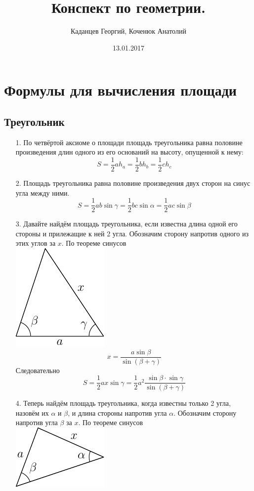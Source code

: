 \documentclass[titlepage]{article}
\title{Конспект по геометрии.}
\author{Каданцев Георгий, Коченюк Анатолий }
\date{13.01.2017}
\begin{document}
\maketitle
\setlength{\unitlength}{1cm}
\section{Формулы для вычисления площади}
    \subsection{Треугольник}
        \begin{itemize}
            \item[1.] По четвёртой аксиоме о площади площадь треугольника равна половине произведения длин одного из его оснований  на высоту, опущенной к нему:  
            $$\boxed{ S= \frac{1}{2}ah_a =\frac{1}{2}bh_b=\frac{1}{2}ch_c} $$
            \item[2.] Площадь треугольника равна половине произведения двух сторон на синус угла между ними.
            $$ \boxed{S=\frac{1}{2}ab\sin \gamma = \frac{1}{2}bc\sin \alpha = \frac{1}{2}ac \sin \beta} $$
            \item[3.] 
             Давайте найдём площадь треугольника, если известна длина одной его стороны и прилежащие к ней 2 угла. Обозначим сторону напротив одного из этих углов за $x$. По теореме синусов\\
             \includegraphics{pic_1o1.pdf}
            $$ x=\frac{a\sin \beta}{\sin (\beta+\gamma)} $$
            Следовательно 
            $$ \boxed{S = \frac{1}{2}ax\sin \gamma= \frac{1}{2}a^2\frac{\sin \beta \cdot \sin \gamma}{\sin (\beta +\gamma)}} $$
            \item[4.] Теперь найдём площадь треугольника, когда известны только 2 угла, назовём их $\alpha$ и $\beta$, и длина стороны напротив угла $\alpha$. Обозначим сторону напротив угла $\beta$ за $x$. По теореме синусов\\
             \includegraphics{pic_2o1.pdf}

\end{itemize}
\end{document}
